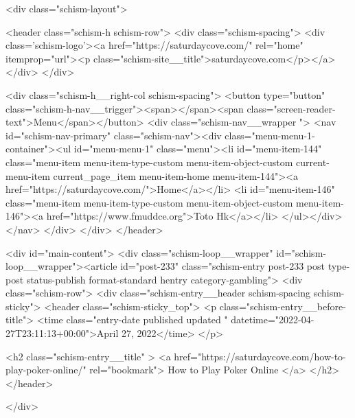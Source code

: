 {		<div class="schism-layout">

		<header class="schism-h schism-row">	<div class="schism-spacing">		<div class='schism-logo'><a href="https://saturdaycove.com/" rel="home" itemprop="url"><p class="schism-site__title">saturdaycove.com</p></a></div>	</div>

			<div class="schism-h__right-col schism-spacing">			<button type="button" class="schism-h-nav__trigger"><span></span><span class="screen-reader-text">Menu</span></button>				<div class="schism-nav__wrapper ">
		<nav id="schism-nav-primary" class="schism-nav"><div class="menu-menu-1-container"><ul id="menu-menu-1" class="menu"><li id="menu-item-144" class="menu-item menu-item-type-custom menu-item-object-custom current-menu-item current_page_item menu-item-home menu-item-144"><a href="https://saturdaycove.com/">Home</a></li>
<li id="menu-item-146" class="menu-item menu-item-type-custom menu-item-object-custom menu-item-146"><a href="https://www.fmuddce.org">Toto Hk</a></li>
</ul></div></nav>	</div>
			</div>
	</header>

<div id="main-content">
	<div class="schism-loop__wrapper" id="schism-loop__wrapper"><article id="post-233" class="schism-entry post-233 post type-post status-publish format-standard hentry category-gambling">
	<div class="schism-row">		<div class="schism-entry__header schism-spacing schism-sticky">			<header class="schism-sticky_top">				<p class="schism-entry__before-title">
					<time class="entry-date published updated " datetime="2022-04-27T23:11:13+00:00">April 27, 2022</time>				</p>

				<h2 class="schism-entry__title" >
					<a href="https://saturdaycove.com/how-to-play-poker-online/" rel="bookmark">
						How to Play Poker Online					</a>
				</h2>
			</header>

					</div>

}
